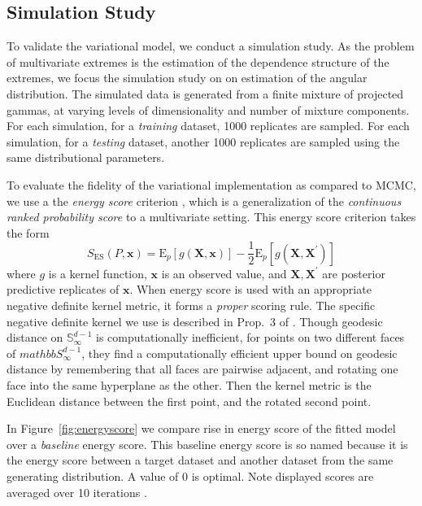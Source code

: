 \subsection{Simulation Study}
To validate the variational model, we conduct a simulation study.
    As the problem of multivariate extremes is the estimation of the dependence
    structure of the extremes, we focus the simulation study on on estimation of
    the angular distribution.  The simulated data is generated from a finite
    mixture of projected gammas, at varying levels of dimensionality and number
    of mixture components.  For each simulation, for a \emph{training} dataset,
    \num{1000} replicates are sampled.  For each simulation, for a 
    \emph{testing} dataset, another \num{1000} replicates are sampled using
    the same distributional parameters.

To evaluate the fidelity of the variational implementation as compared to MCMC, 
    we use a the \emph{energy score} criterion \citep{gneiting2007}, which is a
    generalization of the \emph{continuous ranked probability score} to a
    multivariate setting.  This energy score criterion takes the form
    \[
      S_{\text{ES}}(P, \bm{x}) = \text{E}_p\left[g(\bm{X},\bm{x})\right] - 
        \frac{1}{2}\text{E}_p\left[g(\bm{X},\bm{X}^{\prime})\right]
    \]
    where $g$ is a kernel function, $\bm{x}$ is an observed value, and 
    $\bm{X},\bm{X}^{\prime}$ are posterior predictive replicates of $\bm{x}$.
    When energy score is used with an appropriate negative definite kernel 
    metric, it forms a \emph{proper} scoring rule. The specific negative 
    definite kernel we use is described in Prop.~3 of \cite{trubey:pg}.  Though 
    geodesic distance on $\mathbb{S}_{\infty}^{d-1}$ is computationally inefficient,
    for points on two different faces of $mathbb{S}_{\infty}^{d-1}$,
    they find a computationally efficient upper bound on geodesic distance by 
    remembering that all faces are pairwise adjacent, and rotating one face into the
    same hyperplane as the other.  Then the kernel metric is the Euclidean distance
    between the first point, and the rotated second point.
    
    In Figure~\ref{fig:energyscore} we compare rise in energy score of the fitted
    model over a \emph{baseline} energy score.  This baseline energy score is so
    named because it is the energy score between a target dataset and another
    dataset from the same generating distribution.  A value of 0 is optimal.
      Note displayed scores are 
    averaged over 10 iterations .

